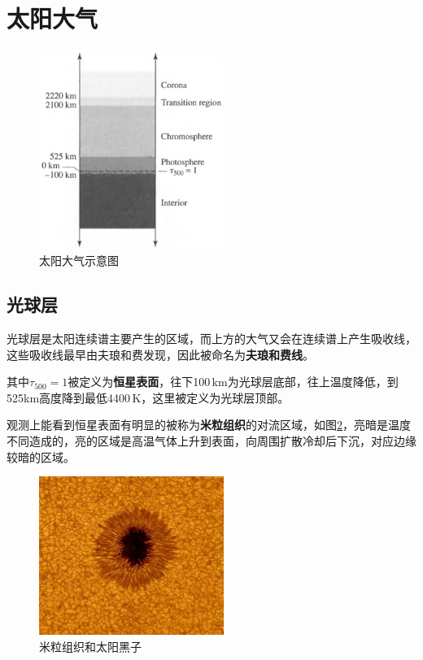 \documentclass[openany]{ctexbook}
\begin{document}
\section{太阳大气}
\begin{figure}[hbt]
  \centering
  \includegraphics[width=6cm]{chapters/11/atmosphere}
  \caption{太阳大气示意图}
  \label{}
\end{figure}

\subsection{光球层}
光球层是太阳连续谱主要产生的区域，而上方的大气又会在连续谱上产生吸收线，这些吸收线最早由夫琅和费发现，因此被命名为\textbf{夫琅和费线}。

其中$\tau_{500}=1$被定义为\textbf{恒星表面}，往下100\,km为光球层底部，往上温度降低，到525km高度降到最低4400\,K，这里被定义为光球层顶部。

观测上能看到恒星表面有明显的被称为\textbf{米粒组织}的对流区域，如图\ref{fig:cell}，亮暗是温度不同造成的，亮的区域是高温气体上升到表面，向周围扩散冷却后下沉，对应边缘较暗的区域。

\begin{figure}[hbt]
  \centering
  \includegraphics[width=6cm]{chapters/11/cell}
  \caption{米粒组织和太阳黑子}
  \label{fig:cell}
\end{figure}
\end{document}
